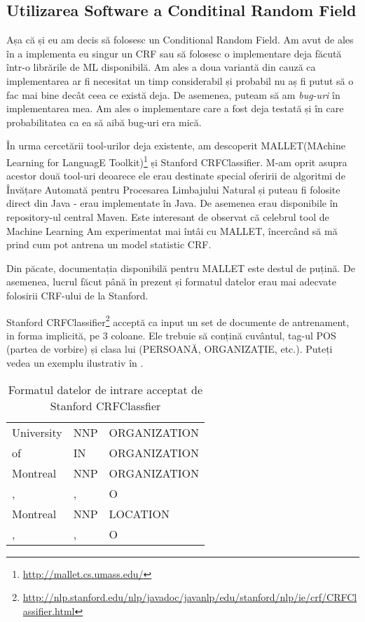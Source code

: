 \subsection{Utilizarea Software a Conditinal Random Field}

Așa că și eu am decis să folosesc un Conditional Random Field. Am avut de ales în a implementa eu singur un CRF sau să folosesc o implementare deja făcută într-o librările de ML disponibilă. Am ales a doua variantă din cauză ca implementarea ar fi necesitat un timp considerabil și probabil nu aș fi putut să o fac mai bine decât ceea ce există deja. De asemenea, puteam să am \textit{bug-uri} în implementarea mea. Am ales o implementare care a fost deja testată și în care probabilitatea ca ea să aibă bug-uri era mică.


În urma cercetării tool-urilor deja existente, am descoperit MALLET(MAchine Learning for LanguagE Toolkit)\footnote{\url{http://mallet.cs.umass.edu/}} și Stanford CRFClassifier. M-am oprit asupra acestor două tool-uri deoarece ele erau destinate special oferirii de algoritmi de Învățare Automată pentru Procesarea Limbajului Natural și puteau fi folosite direct din Java - erau implementate în Java. De asemenea erau disponibile în repository-ul central Maven. Este interesant de observat că celebrul tool de Machine Learning  Am experimentat mai întâi cu MALLET, încercând să mă prind cum pot antrena un model statistic CRF. 

Din păcate, documentația disponibilă pentru MALLET este destul de puțină. De asemenea, lucrul făcut până în prezent și formatul datelor erau mai adecvate folosirii CRF-ului de la Stanford.

Stanford CRFClassifier\footnote{\url{http://nlp.stanford.edu/nlp/javadoc/javanlp/edu/stanford/nlp/ie/crf/CRFClassifier.html}} acceptă ca input un set de documente de antrenament, in forma implicită, pe 3 coloane. Ele trebuie să conțină cuvântul, tag-ul POS (partea de vorbire) și clasa lui (PERSOANĂ, ORGANIZAȚIE, etc.). Puteți vedea un exemplu ilustrativ în .

\begin{center}
\begin{table}[htb]
  \caption{Formatul datelor de intrare acceptat de Stanford CRFClassfier}
  \begin{tabular}{l l l}
   University & NNP & ORGANIZATION \\
   of & IN & ORGANIZATION \\
   Montreal & NNP & ORGANIZATION \\
   ,& , & O \\
   Montreal & NNP & LOCATION\\
   ,& ,& O\\
  \end{tabular}
  \label{table:input-crf}
\end{table}
\end{center}

